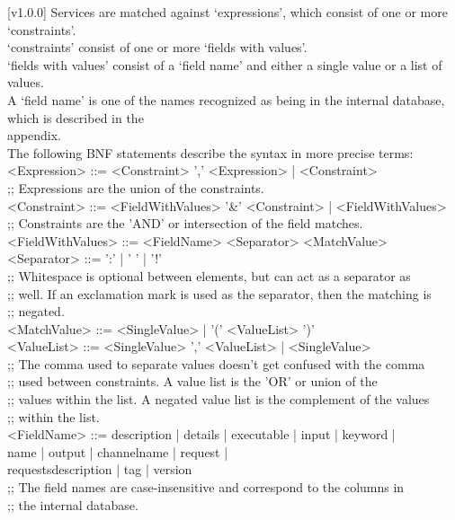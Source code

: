 [v1.0.0]
%
Services are matched against `expressions', which consist of one or more
`constraints'.\\
`constraints' consist of one or more `fields with values'.\\
`fields with values' consist of a `field name' and either a single value or a list of
values.\\
A `field name' is one of the names recognized as being in the internal database, which is
described in the\\
 appendix.\\

The following BNF statements describe the syntax in more precise terms:
\outputBegin{}
<Expression> ::= <Constraint> ',' <Expression> | <Constraint>\\
;; Expressions are the union of the constraints.\\

<Constraint> ::= <FieldWithValues> '\&' <Constraint> | <FieldWithValues>\\
;; Constraints are the 'AND' or intersection of the field matches.\\

<FieldWithValues> ::= <FieldName> <Separator> <MatchValue>\\
<Separator> ::= ':' | ' ' | '!'\\
;; Whitespace is optional between elements, but can act as a separator as\\
;; well. If an exclamation mark is used as the separator, then the matching is\\
;; negated.\\

<MatchValue> ::= <SingleValue> | '(' <ValueList> ')'\\
<ValueList> ::= <SingleValue> ',' <ValueList> | <SingleValue>\\
;; The comma used to separate values doesn't get confused with the comma\\
;; used between constraints. A value list is the 'OR' or union of the\\
;; values within the list. A negated value list is the complement of the values\\
;; within the list.\\

\settowidth{\utilLen}{<FieldName> ::= }%
<FieldName> ::= description | details | executable | input | keyword |\\
\hspace*{\utilLen}name | output | channelname | request |\\
\hspace*{\utilLen}requestsdescription | tag | version\\
;; The field names are case-insensitive and correspond to the columns in\\
;; the internal database.\\

